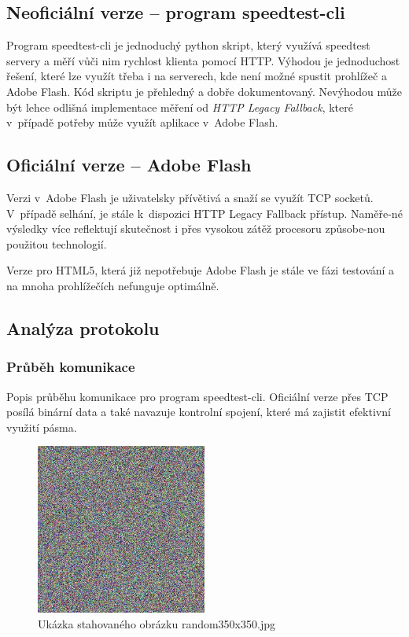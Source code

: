 \documentclass[12pt,a4paper]{article}
\begin{document}
\subsection{Neoficiální verze -- program speedtest-cli}

Program speedtest-cli je jednoduchý python skript, který využívá speedtest servery a měří vůči nim rychlost klienta pomocí HTTP. Výhodou je jednoduchost řešení, které lze využít třeba i na serverech, kde není možné spustit prohlížeč a Adobe Flash. Kód skriptu je přehledný a dobře dokumentovaný. Nevýhodou může být lehce odlišná implementace měření od \textit{HTTP Legacy Fallback}, které v~případě potřeby může využít aplikace v~Adobe Flash.


\subsection{Oficiální verze -- Adobe Flash}

Verzi v~Adobe Flash je uživatelsky přívětivá a snaží se využít TCP socketů. V~případě selhání, je stále k~dispozici HTTP Legacy Fallback přístup. Naměře-né výsledky více reflektují skutečnost i přes vysokou zátěž procesoru způsobe-nou použitou technologií.

\bigskip 

Verze pro HTML5, která již nepotřebuje Adobe Flash je stále ve fázi testování a na mnoha prohlížečích nefunguje optimálně.


\subsection{Analýza protokolu}

\subsubsection{Průběh komunikace}

Popis průběhu komunikace pro program speedtest-cli. Oficiální verze přes TCP posílá binární data a také navazuje kontrolní spojení, které má zajistit efektivní využití pásma.

\begin{figure}[h]
\centering
\includegraphics[width=0.5\textwidth]{random350x350.jpg}
\caption{Ukázka stahovaného obrázku random350x350.jpg}
\label{random350}
\end{figure}
\end{document}
